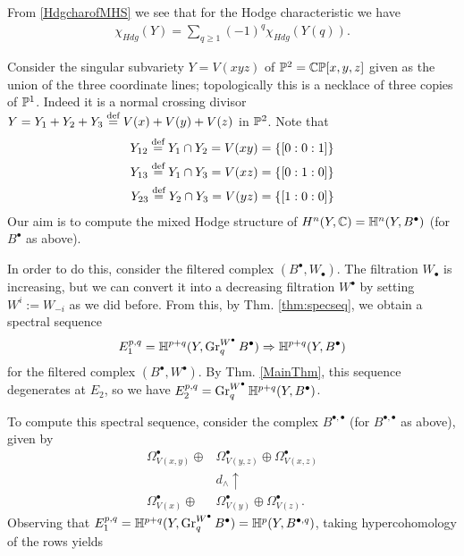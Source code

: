 \documentclass[../main.tex]{subfiles}
\begin{document}
From \eqref{HdgcharofMHS} we see that for the Hodge characteristic we have
\begin{align} \label{HdgcharNCD}
    \chi_{Hdg} (Y)= \sum_{q \geq 1} (-1)^q \chi_{Hdg} (Y(q)). 
\end{align}



\begin{es} 
\label{example-MHS4}
Consider the singular subvariety $Y=V(xyz)$ of $\mathbb{P}^2=\mathbb{C}\mathbb{P}[x,y,z]$ given as the union of the three coordinate lines; topologically this is a necklace of three copies of $\mathbb{P}^1$. Indeed it is a normal crossing divisor $Y=Y_1+Y_2+Y_3 \stackrel{\text{def}}{=} V(x)+V(y)+V(z)$ in $\mathbb{P}^2$. Note that 
\begin{align*}
Y_{12} \stackrel{\text{def}}{=} Y_1 \cap Y_2 = V(xy)= \{ [0:0:1] \} \\
Y_{13} \stackrel{\text{def}}{=} Y_1 \cap Y_3 = V(xz) = \{ [0:1:0] \} \\
Y_{23} \stackrel{\text{def}}{=} Y_2 \cap Y_3 = V(yz) = \{ [1:0:0] \}
\end{align*} 
Our aim is to compute the mixed Hodge structure of $H^n(Y,\mathbb{C}) = \mathbb{H}^n(Y,B^{\bullet})$ (for $B^{\bullet}$ as above). 

In order to do this, consider the filtered complex $(B^\bullet, W_\bullet)$. The filtration $W_{\bullet}$ is increasing, but we can convert it into a decreasing filtration $W^{\bullet}$ by setting $W^i:=W_{-i}$ as we did before. From this, by Thm. \ref{thm:specseq}, we obtain a spectral sequence
\[E_1^{p,q}=\mathbb{H}^{p+q}(Y,\operatorname{Gr}^{W^\bullet}_{q} B^\bullet) \Rightarrow \mathbb{H}^{p+q}(Y,B^\bullet)\]
for the filtered complex $(B^\bullet, W^\bullet)$. By Thm. \ref{MainThm}, this sequence degenerates at $E_2$, so we have $E_2^{p,q} = \operatorname{Gr}^{W^\bullet}_{q}\mathbb{H}^{p+q}(Y,B^{\bullet})$.
 
To compute this spectral sequence, consider the complex $B^{\bullet,\bullet}$ (for $B^{\bullet,\bullet}$ as above), given by
\begin{align*}
\Omega^\bullet_{V(x,y)}\oplus &\Omega^\bullet_{V(y,z)}\oplus \Omega^\bullet_{V(x,z)} \\
&{d_\wedge}{\uparrow} \\
\Omega^\bullet_{V(x)} \oplus &\Omega^\bullet_{V(y)}\oplus \Omega^\bullet_{V(z)}.
\end{align*}
Observing that $E_1^{p,q} = \mathbb{H}^{p+q}(Y,\operatorname{Gr}^{W^\bullet}_{q} B^\bullet) = \mathbb{H}^p(Y,B^{\bullet,q})$, taking hypercohomology of the rows yields
\begin{center}
 

\end{center}
\end{es}
\end{document}

